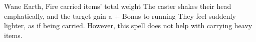   {}%
  {Wane}%
  {Earth, Fire}%
  {carried items' total \gls{weight}}%
  {The caster shakes their head emphatically, and the target gain a + Bonus to running}%
  {They feel suddenly lighter, as if being carried.
  However, this spell does not help with carrying heavy items.}
